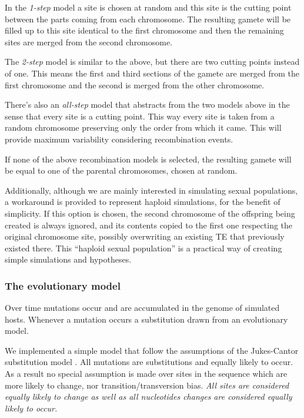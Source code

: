 \documentclass[10pt]{article}
\begin{document}
In the \emph{1-step} model a site is chosen at random and this site is
the cutting point between the parts coming from each chromosome. The
resulting gamete will be filled up to this site identical to the first
chromosome and then the remaining sites are merged from the second
chromosome.

The \emph{2-step} model is similar to the above, but there are two
cutting points instead of one. This means the first and third sections
of the gamete are merged from the first chromosome and the second is
merged from the other chromosome.

There's also an \emph{all-step} model that abstracts from the two
models above in the sense that every site is a cutting point. This way
every site is taken from a random chromosome preserving only the order
from which it came. This will provide maximum variability considering
recombination events.

If none of the above recombination models is selected, the resulting
gamete will be equal to one of the parental chromosomes, chosen at
random.

Additionally, although we are mainly interested in simulating sexual
populations, a workaround is provided to represent haploid
simulations, for the benefit of simplicity. If this option is chosen,
the second chromosome of the offspring being created is always
ignored, and its contents copied to the first one respecting the
original chromosome site, possibly overwriting an existing TE that
previously existed there. This ``haploid sexual population'' is a
practical way of creating simple simulations and hypotheses.

\subsubsection{The evolutionary model}

Over time mutations occur and are accumulated in the genome of
simulated hosts. Whenever a mutation occurs a substitution drawn from
an evolutionary model.

We implemented a simple model that follow the assumptions of the
Jukes-Cantor substitution model \cite{JC69}. All mutations are
substitutions and equally likely to occur. As a result no special
assumption is made over sites in the sequence which are more likely to
change, nor transition/transversion bias. \emph{ All sites are
  considered equally likely to change as well as all nucleotides
  changes are considered equally likely to occur.}
\end{document}
